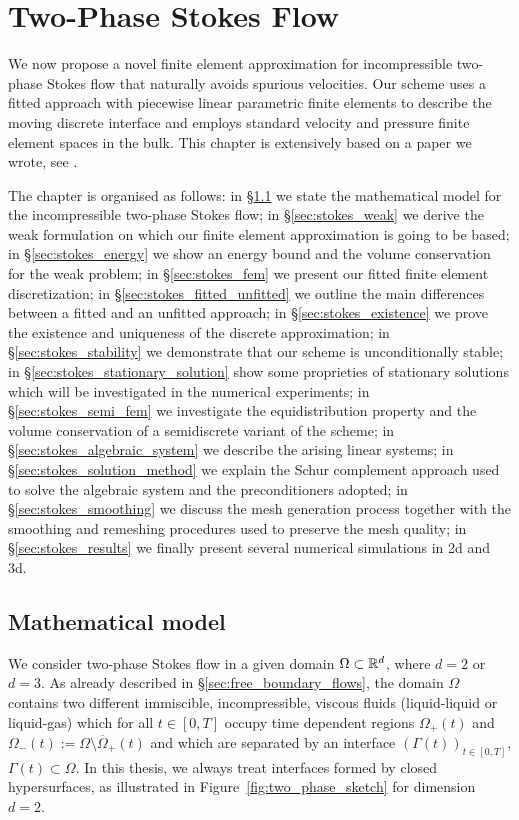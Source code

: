 \chapter{\sc Two-Phase Stokes Flow}\label{ch:stokes}
We now propose a novel finite element approximation for incompressible
two-phase Stokes flow that naturally avoids spurious velocities. Our scheme uses
a fitted approach with piecewise linear parametric finite elements to describe
the moving discrete interface and employs standard velocity and pressure finite
element spaces in the bulk. This chapter is extensively based on a paper we
wrote, see \cite{stokesfitted}.

The chapter is organised as follows: in \S\ref{sec:stokes_model} we state the
mathematical model for the incompressible two-phase Stokes flow; in
\S\ref{sec:stokes_weak} we derive the weak formulation on which our finite
element approximation is going to be based; in \S\ref{sec:stokes_energy} we show
an energy bound and the volume conservation for the weak problem; in
\S\ref{sec:stokes_fem} we present our fitted finite element discretization; in
\S\ref{sec:stokes_fitted_unfitted} we outline the main differences between a
fitted and an unfitted approach; in \S\ref{sec:stokes_existence} we prove the
existence and uniqueness of the discrete approximation; in
\S\ref{sec:stokes_stability} we demonstrate that our scheme is unconditionally
stable; in \S\ref{sec:stokes_stationary_solution} show some proprieties of
stationary solutions which will be investigated in the numerical experiments; in
\S\ref{sec:stokes_semi_fem} we investigate the equidistribution property and the
volume conservation of a semidiscrete variant of the scheme; in
\S\ref{sec:stokes_algebraic_system} we describe the arising linear systems; in
\S\ref{sec:stokes_solution_method} we explain the Schur complement approach used
to solve the algebraic system and the preconditioners adopted; in
\S\ref{sec:stokes_smoothing} we discuss the mesh generation process together
with the smoothing and remeshing procedures used to preserve the mesh quality;
in \S\ref{sec:stokes_results} we finally present several numerical simulations
in 2d and 3d.

\section{Mathematical model}\label{sec:stokes_model}
We consider two-phase Stokes flow in a given domain $\Omega\subset\mathbb R^d$, where
$d=2$ or $d=3$. As already described in \S\ref{sec:free_boundary_flows},
the domain $\Omega$ contains two different immiscible, incompressible, viscous
fluids (liquid-liquid or liquid-gas) which for all $t\in[0,T]$ occupy time
dependent regions $\Omega_+(t)$ and
$\Omega_-(t):=\Omega\setminus\overline{\Omega}_+(t)$ and which are separated by
an interface $(\Gamma(t))_{t\in[0,T]}$, $\Gamma(t)\subset\Omega$. In this
thesis, we always treat interfaces formed by closed hypersurfaces, as
illustrated in Figure~\ref{fig:two_phase_sketch} for dimension $d=2$.

